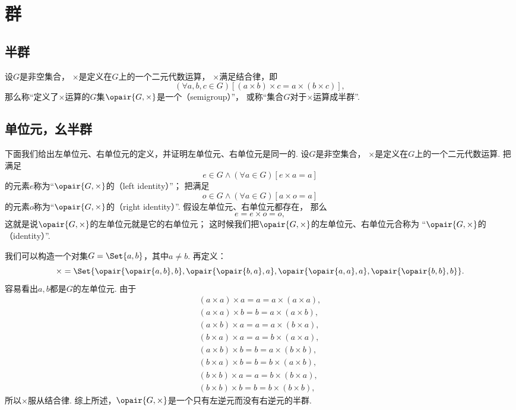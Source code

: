 \section{群}
\subsection{半群}
\begin{definition}\label{definition:抽象代数.半群的定义}
设\(G\)是非空集合，
\(\times\)是定义在\(G\)上的一个二元代数运算，
\(\times\)满足结合律，即\[
	(\forall a,b,c \in G)
	[(a \times b) \times c = a \times (b \times c)],
\]
那么称“定义了\(\times\)运算的\(G\)集\(\opair{G,\times}\)是一个（semigroup）”，
或称“集合\(G\)对于\(\times\)运算成半群”.
\end{definition}

\subsection{单位元，幺半群}
下面我们给出左单位元、右单位元的定义，并证明左单位元、右单位元是同一的.
设\(G\)是非空集合，
\(\times\)是定义在\(G\)上的一个二元代数运算.
把满足\[
	e \in G
	\land
	(\forall a \in G)[e \times a = a]
\]的元素\(e\)称为“\(\opair{G,\times}\)的（left identity）”；
把满足\[
	o \in G
	\land
	(\forall a \in G)[a \times o = a]
\]的元素\(o\)称为“\(\opair{G,\times}\)的（right identity）”.
假设左单位元、右单位元都存在，
那么\[
	e = e \times o = o,
\]
这就是说\(\opair{G,\times}\)的左单位元就是它的右单位元；
这时候我们把\(\opair{G,\times}\)的左单位元、右单位元合称为%
“\(\opair{G,\times}\)的（identity）”.

\begin{example}
我们可以构造一个对集\(G = \Set{ a, b }\)，其中\(a \neq b\).
再定义：\[
	\times = \Set{
		\opair{\opair{a,b},b},
		\opair{\opair{b,a},a},
		\opair{\opair{a,a},a},
		\opair{\opair{b,b},b}
	}.
\]
容易看出\(a,b\)都是\(G\)的左单位元.
由于\begin{align*}
	(a \times a) \times a = a = a \times (a \times a), \\
	(a \times a) \times b = b = a \times (a \times b), \\
	(a \times b) \times a = a = a \times (b \times a), \\
	(b \times a) \times a = a = b \times (a \times a), \\
	(a \times b) \times b = b = a \times (b \times b), \\
	(b \times a) \times b = b = b \times (a \times b), \\
	(b \times b) \times a = a = b \times (b \times a), \\
	(b \times b) \times b = b = b \times (b \times b),
\end{align*}
所以\(\times\)服从结合律.
综上所述，\(\opair{G,\times}\)是一个只有左逆元而没有右逆元的半群.
\end{example}

